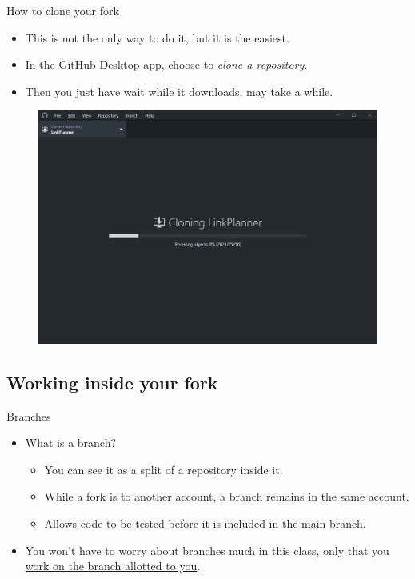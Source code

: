 \documentclass[usenames,dvipsnames,aspectratio=169]{beamer}
\newcommand{\aitem}{\item[$\cdot$]}
\newcommand{\bitem}{\item[-]}
\begin{document}
\begin{frame}[t]{How to clone your fork}%
\begin{minipage}{5cm}
\begin{itemize}
\aitem This is not the only way to do it, but it is the easiest.
\aitem In the GitHub Desktop app, choose to \textit{clone a repository}.
\aitem Then you just have wait while it downloads, may take a while.
\end{itemize}
\end{minipage}%
\hspace{.5cm}%
\begin{minipage}[*]{8cm}
\begin{figure}
\centering
\includegraphics[width=\linewidth]{cloning3}
\end{figure}
\end{minipage}
\end{frame}


\subsection{Working inside your fork}
\begin{frame}[t]{Branches}
\begin{itemize}
\aitem What is a branch?
\begin{itemize}
\bitem You can see it as a split of a repository inside it.
\bitem While a fork is to another account, a branch remains in the same account.
\bitem Allows code to be tested before it is included in the main branch.
\end{itemize}
\aitem You won't have to worry about branches much in this class, only that you \underline{work on the branch allotted to you}.
\end{itemize}
\end{frame}
\end{document}
